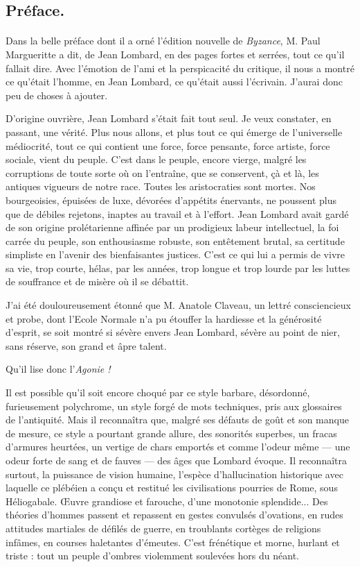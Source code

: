 \documentclass[a4paper, 11pt, oneside, polutonikogreek, french]{article}
\begin{document}
\subsection*{Préface.}
\paragraph{}
Dans la belle préface dont il a orné l'édition nouvelle de \emph{Byzance}, M. Paul Margueritte a dit, de Jean Lombard, en des pages fortes et serrées, tout ce qu'il fallait dire. Avec l'émotion de l'ami et la perspicacité du critique, il nous a montré ce qu'était l'homme, en Jean Lombard, ce qu'était aussi l'écrivain. J'aurai donc peu de choses à ajouter.

D'origine ouvrière, Jean Lombard s'était fait tout seul. Je veux constater, en passant, une vérité. Plus nous allons, et plus tout ce qui émerge de l'universelle médiocrité, tout ce qui contient une force, force pensante, force artiste, force sociale, vient du peuple. C'est dans le peuple, encore vierge, malgré les corruptions de toute sorte où on l'entraîne, que se conservent, çà et là, les antiques vigueurs de notre race. Toutes les aristocraties sont mortes. Nos bourgeoisies, épuisées de luxe, dévorées d'appétits énervants, ne poussent plus que de débiles rejetons, inaptes au travail et à l'effort. Jean Lombard avait gardé de son origine prolétarienne affinée par un prodigieux labeur intellectuel, la foi carrée du peuple, son enthousiasme robuste, son entêtement brutal, sa certitude simpliste en l'avenir des bienfaisantes justices. C'est ce qui lui a permis de vivre sa vie, trop courte, hélas, par les années, trop longue et trop lourde par les luttes de souffrance et de misère où il se débattit.

J'ai été douloureusement étonné que M. Anatole Claveau, un lettré consciencieux et probe, dont l'Ecole Normale n'a pu étouffer la hardiesse et la générosité d'esprit, se soit montré si sévère envers Jean Lombard, sévère au point de nier, sans réserve, son grand et âpre talent.

Qu'il lise donc l'\emph{Agonie !}

Il est possible qu'il soit encore choqué par ce style barbare, désordonné, furieusement polychrome, un style forgé de mots techniques, pris aux glossaires de l'antiquité. Mais il reconnaîtra que, malgré ses défauts de goût et son manque de mesure, ce style a pourtant grande allure, des sonorités superbes, un fracas d'armures heurtées, un vertige de chars emportés et comme l'odeur même --- une odeur forte de sang et de fauves --- des âges que Lombard évoque. Il reconnaîtra surtout, la puissance de vision humaine, l'espèce d'hallucination historique avec laquelle ce plébéien a conçu et restitué les civilisations pourries de Rome, sous Héliogabale. Œuvre grandiose et farouche, d'une monotonie splendide... Des théories d'hommes passent et repassent en gestes convulsés d'ovations, en rudes attitudes martiales de défilés de guerre, en troublants cortèges de religions infâmes, en courses haletantes d'émeutes. C'est frénétique et morne, hurlant et triste : tout un peuple d'ombres violemment soulevées hors du néant.
\end{document}
